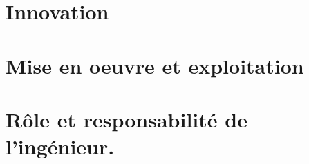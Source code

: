 
\section{Innovation}



\section{Mise en oeuvre et exploitation}



\section{Rôle et responsabilité de l'ingénieur.}


